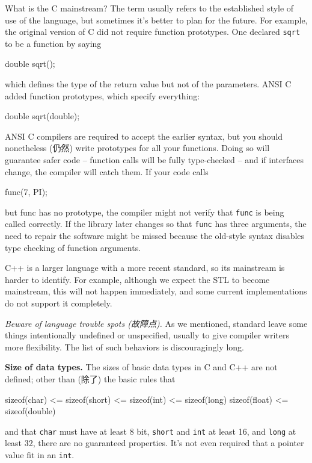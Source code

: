 What is the C mainstream? The term usually refers to the established style
of use of the language, but sometimes it's better to plan for the future.
For example, the original version of C did not require function prototypes.
One declared \verb'sqrt' to be a function by saying
\begin{badcode}
    double sqrt();
\end{badcode}
which defines the type of the return value but not of the parameters. ANSI
C added function prototypes, which specify everything:
\begin{wellcode}
    double sqrt(double);
\end{wellcode}
ANSI C compilers are required to accept the earlier syntax, but you should
nonetheless (仍然) write prototypes for all your functions. Doing so will
guarantee safer code -- function calls will be fully type-checked -- and if
interfaces change, the compiler will catch them. If your code calls
\begin{wellcode}
    func(7, PI);
\end{wellcode}
but func has no prototype, the compiler might not verify that \verb'func'
is being called correctly. If the library later changes so that \verb'func'
has three arguments, the need to repair the software might be missed
because the old-style syntax disables type checking of function arguments.

C++ is a larger language with a more recent standard, so its mainstream is
harder to identify. For example, although we expect the STL to become
mainstream, this will not happen immediately, and some current
implementations do not support it completely.

\emph{Beware of language trouble spots (故障点).} As we mentioned, standard
leave some things intentionally undefined or unspecified, usually to give
compiler writers more flexibility. The list of such behaviors is
discouragingly long.

\textbf{Size of data types.} The sizes of basic data types in C and C++ are
not defined; other than (除了) the basic rules that
\begin{wellcode}
    sizeof(char) <= sizeof(short) <= sizeof(int) <= sizeof(long)
    sizeof(float) <= sizeof(double)
\end{wellcode}
and that \verb'char' must have at least 8 bit, \verb'short' and \verb'int'
at least 16, and \verb'long' at least 32, there are no guaranteed
properties. It's not even required that a pointer value fit in an
\verb'int'.

